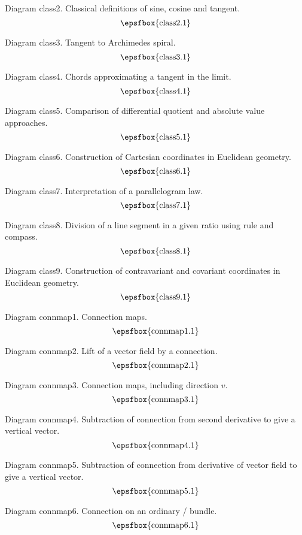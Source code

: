 Diagram class2. Classical definitions of sine, cosine and tangent.
$$
\centerline{\epsfbox{class2.1}}
$$

Diagram class3. Tangent to Archimedes spiral.
$$
\centerline{\epsfbox{class3.1}}
$$

Diagram class4. Chords approximating a tangent in the limit.
$$
\centerline{\epsfbox{class4.1}}
$$

\filleject

Diagram class5. Comparison of differential quotient and absolute value
approaches.
$$
\centerline{\epsfbox{class5.1}}
$$

Diagram class6. Construction of Cartesian coordinates in Euclidean geometry.
$$
\centerline{\epsfbox{class6.1}}
$$

Diagram class7. Interpretation of a parallelogram law.
$$
\centerline{\epsfbox{class7.1}}
$$

Diagram class8. Division of a line segment in a given ratio using rule and
compass.
$$
\centerline{\epsfbox{class8.1}}
$$

\filleject

Diagram class9. Construction of contravariant and covariant coordinates in
Euclidean geometry.
$$
\centerline{\epsfbox{class9.1}}
$$

\secteject
\edef\SECTconnmap{\the\pageno}

Diagram connmap1. Connection maps.
$$
\centerline{\epsfbox{connmap1.1}}
$$

Diagram connmap2. Lift of a vector field by a connection.
$$
\centerline{\epsfbox{connmap2.1}}
$$

Diagram connmap3. Connection maps, including direction $v$.
$$
\centerline{\epsfbox{connmap3.1}}
$$

\filleject

Diagram connmap4. Subtraction of connection from second derivative to give a
vertical vector.
$$
\centerline{\epsfbox{connmap4.1}}
$$

Diagram connmap5. Subtraction of connection from derivative of vector field to
give a vertical vector.
$$
\centerline{\epsfbox{connmap5.1}}
$$

Diagram connmap6. Connection on an ordinary \fibre/ bundle.
$$
\centerline{\epsfbox{connmap6.1}}
$$

